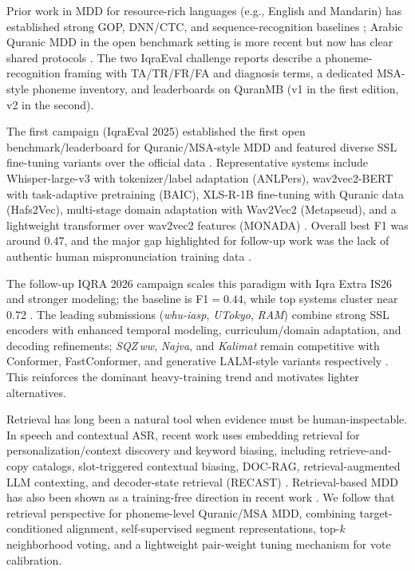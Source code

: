 \documentclass[11pt]{article}
\begin{document}
Prior work in MDD for resource-rich languages (e.g., English and Mandarin) has established strong GOP, DNN/CTC, and sequence-recognition baselines \citep{li-etal-2016-mdd,leung-etal-2019-cnn-rnn-ctc,neri-etal-2008-capt,rogerson-revell-2021-capt}; Arabic Quranic MDD in the open benchmark setting is more recent but now has clear shared protocols \citep{el-kheir-etal-2025-iqraeval,el-kheir-etal-2026-iqra-interspeech}.
The two IqraEval challenge reports describe a phoneme-recognition framing with TA/TR/FR/FA and diagnosis terms, a dedicated MSA-style phoneme inventory, and leaderboards on QuranMB (v1 in the first edition, v2 in the second).

The first campaign (IqraEval 2025) established the first open benchmark/leaderboard for Quranic/MSA-style MDD and featured diverse SSL fine-tuning variants over the official data \citep{el-kheir-etal-2025-iqraeval}. Representative systems include Whisper-large-v3 with tokenizer/label adaptation (ANLPers), wav2vec2-BERT with task-adaptive pretraining (BAIC), XLS-R-1B fine-tuning with Quranic data (Hafs2Vec), multi-stage domain adaptation with Wav2Vec2 (Metapseud), and a lightweight transformer over wav2vec2 features (MONADA) \citep{qandos-etal-2025-anlpers,mattar-etal-2025-baic,ibrahim-2025-hafs2vec,mansour-2025-metapseud,daoud-messaoud-2025-monada}. Overall best F1 was around 0.47, and the major gap highlighted for follow-up work was the lack of authentic human mispronunciation training data \citep{el-kheir-etal-2025-iqraeval,el-kheir-etal-2026-iqra-interspeech}.

The follow-up IQRA 2026 campaign scales this paradigm with Iqra Extra IS26 and stronger modeling; the baseline is F1$=0.44$, while top systems cluster near 0.72 \citep{el-kheir-etal-2026-iqra-interspeech}. The leading submissions (\textit{whu-iasp}, \textit{UTokyo}, \textit{RAM}) combine strong SSL encoders with enhanced temporal modeling, curriculum/domain adaptation, and decoding refinements; \textit{SQZ\,ww}, \textit{Najva}, and \textit{Kalimat} remain competitive with Conformer, FastConformer, and generative LALM-style variants respectively \citep{el-kheir-etal-2026-iqra-interspeech}. This reinforces the dominant heavy-training trend and motivates lighter alternatives.

Retrieval has long been a natural tool when evidence must be human-inspectable. In speech and contextual ASR, recent work uses embedding retrieval for personalization/context discovery and keyword biasing, including retrieve-and-copy catalogs, slot-triggered contextual biasing, DOC-RAG, retrieval-augmented LLM contexting, and decoder-state retrieval (RECAST) \citep{muralidhar-jayanthi-etal-2023-retrieve-copy,tong-etal-2023-slot-triggered,mathur-etal-2024-doc-rag,xiao-etal-2025-contextual-asr-rag-llm,siskos-etal-2025-rag-asr,mittal-etal-2025-recast}. Retrieval-based MDD has also been shown as a training-free direction in recent work \citep{tu-etal-2025-per-mdd}. We follow that retrieval perspective for phoneme-level Quranic/MSA MDD, combining target-conditioned alignment, self-supervised segment representations, top-$k$ neighborhood voting, and a lightweight pair-weight tuning mechanism for vote calibration.
\end{document}
